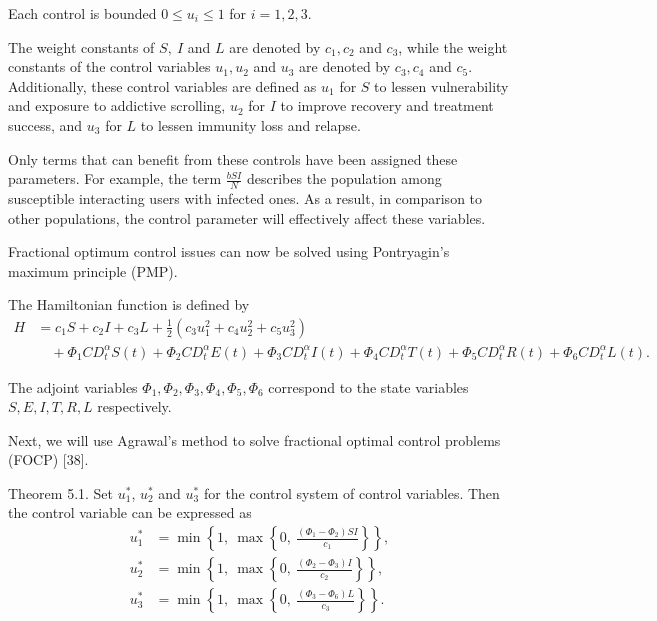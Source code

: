 \documentclass[10pt]{NSP1}
\begin{document}
	Each control is bounded \(0 \leq u_i \leq 1\) for \(i=1,2,3\).
	
	The weight constants of \(S,\ I\) and \(L\) are denoted by \(c_1,c_2\) and \(c_3\), while the weight constants of the control variables \(u_1,u_2\) and \(u_3\) are denoted by \(c_3,c_4\) and \(c_5\). Additionally, these control variables are defined as \(u_1\) for \(S\) to lessen vulnerability and exposure to addictive scrolling, \(u_2\) for \(I\) to improve recovery and treatment success, and \(u_3\) for \(L\) to lessen immunity loss and relapse.
	
	Only terms that can benefit from these controls have been assigned these parameters. For example, the term \(\frac{bSI}{N}\) describes the population among susceptible interacting users with infected ones. As a result, in comparison to other populations, the control parameter will effectively affect these variables.
	
	Fractional optimum control issues can now be solved using Pontryagin's maximum principle (PMP).
	
	The Hamiltonian function is defined by
	\[
	\begin{aligned}
		H &= c_1 S + c_2 I + c_3 L + \frac{1}{2}\left( c_3 u_1^2 + c_4 u_2^2 + c_5 u_3^2 \right) \\
		&\quad + \Phi_1 CD_{t}^{\alpha} S(t) + \Phi_2 CD_{t}^{\alpha} E(t) + \Phi_3 CD_{t}^{\alpha} I(t) + \Phi_4 CD_{t}^{\alpha} T(t) + \Phi_5 CD_{t}^{\alpha} R(t) + \Phi_6 CD_{t}^{\alpha} L(t).
	\end{aligned} \tag{5.4}
	\]
	
	The adjoint variables \(\Phi_1,\Phi_2,\Phi_3,\Phi_4,\Phi_5,\Phi_6\) correspond to the state variables \(S,E,I,T,R,L\) respectively.
	
	Next, we will use Agrawal's method to solve fractional optimal control problems (FOCP) [38].
	
	Theorem 5.1. Set \(u_1^{*}\), \(u_2^{*}\) and \(u_3^{*}\) for the control system of control variables. Then the control variable can be expressed as
	\[
	\begin{aligned}
		u_1^{*} &= \min\left\{1,\ \max\left\{0,\ \frac{(\Phi_1-\Phi_2) S I}{c_1}\right\}\right\},\\
		u_2^{*} &= \min\left\{1,\ \max\left\{0,\ \frac{(\Phi_2-\Phi_3) I}{c_2}\right\}\right\},\\
		u_3^{*} &= \min\left\{1,\ \max\left\{0,\ \frac{(\Phi_3-\Phi_6) L}{c_3}\right\}\right\}.
	\end{aligned} \tag{5.5}
	\]
	
\end{document}
